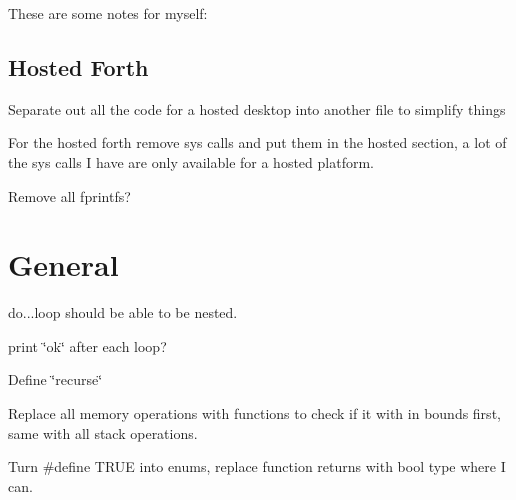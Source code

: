 

These are some notes for myself\-:

\subsection*{Hosted Forth}


\begin{DoxyItemize}
\item Separate out all the code for a hosted desktop into another file to simplify things
\end{DoxyItemize}


\begin{DoxyItemize}
\item For the hosted forth remove sys calls and put them in the hosted section, a lot of the sys calls I have are only available for a hosted platform.
\end{DoxyItemize}


\begin{DoxyItemize}
\item Remove all fprintfs?
\end{DoxyItemize}

\section*{General}


\begin{DoxyItemize}
\item do...loop should be able to be nested.
\end{DoxyItemize}


\begin{DoxyItemize}
\item print \char`\"{}ok\char`\"{} after each loop?
\end{DoxyItemize}


\begin{DoxyItemize}
\item Define \char`\"{}recurse\char`\"{}
\end{DoxyItemize}


\begin{DoxyItemize}
\item Replace all memory operations with functions to check if it with in bounds first, same with all stack operations.
\end{DoxyItemize}


\begin{DoxyItemize}
\item Turn \#define T\-R\-U\-E into enums, replace function returns with bool type where I can.
\end{DoxyItemize}


